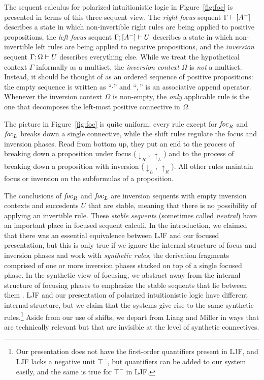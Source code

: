 \documentclass[acmtocl]{robtrans}\pdfoutput=1
\newcommand{\rfoc}[2]{{#1} \vdash [{#2}] \mathstrut}
\newcommand{\lfoc}[3]{{#1}; [{#2}] \vdash {#3} \mathstrut}
\newcommand{\ifoc}[3]{{#1}; {#2} \vdash {#3} \mathstrut}
\begin{document}
The sequent calculus for polarized intuitionistic logic in
Figure~\ref{fig:foc} is presented in terms of this three-sequent view.
The {\it right focus} sequent $\rfoc{\Gamma}{A^+}$ describes a state
in which non-invertible right rules are being applied to positive
propositions, the {\it left focus} sequent $\lfoc{\Gamma}{A^-}{U}$
describes a state in which non-invertible left rules are being applied
to negative propositions, and the {\it inversion} sequent
$\ifoc{\Gamma}{\Omega}{U}$ describes everything else. While we treat
the hypothetical context $\Gamma$ informally as a multiset, the {\it
  inversion context} $\Omega$ is {\it not} a multiset. Instead, it
should be thought of as an ordered sequence of positive propositions:
the empty sequence is written as ``$\cdot$'' and ``$,$'' is an
associative append operator.  Whenever the inversion context $\Omega$ is
non-empty, the {\it only} applicable rule is the one that decomposes
the left-most positive connective in $\Omega$.

The picture in Figure~\ref{fig:foc} is quite uniform: every rule
except for ${\it foc}_R$ and ${\it foc}_L$ breaks down a single
connective, while the shift rules regulate the focus and inversion
phases.  Read from bottom up, they put an end to the process of
breaking down a proposition under focus (${\downarrow}_R$,
${\uparrow}_L$) and to the process of breaking down a proposition with
inversion (${\downarrow}_L$, ${\uparrow}_R$). All other rules maintain
focus or inversion on the subformulas of a proposition.

The conclusions of ${\it foc}_R$ and ${\it foc}_L$ are inversion
sequents with empty inversion contexts and succedents $U$ that are
stable, meaning that there is no possibility of applying an invertible
rule.  These {\it stable sequents} (sometimes called {\it neutral})
have an important place in focused sequent calculi.  In the
introduction, we claimed that there was an essential equivalence
between LJF and our focused presentation, but this is only true if we
ignore the internal structure of focus and inversion phases and work
with {\it synthetic rules}, the derivation fragments comprised of one
or more inversion phases stacked on top of a single focused phase. In
the synthetic view of focusing, we abstract away from the internal
structure of focusing phases to emphasize the stable sequents that lie
between them \cite{andreoli01focussing}. LJF and our presentation of
polarized intuitionistic logic have different internal structure, but
we claim that the systems give rise to the same synthetic
rules.\footnote{Our presentation does not have the first-order
  quantifiers present in LJF, and LJF lacks a negative unit $\top^-$,
  but quantifiers can be added to our system easily, and the same is
  true for $\top^-$ in LJF.} Aside from our use of shifts, we depart
from Liang and Miller in ways that are technically relevant but that
are invisible at the level of synthetic connectives.
\end{document}
